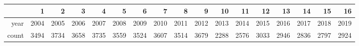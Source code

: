\begin{table}[ht]
\centering
\begin{tabular}{rrrrrrrrrrrrrrrrr}
  \hline
 & 1 & 2 & 3 & 4 & 5 & 6 & 7 & 8 & 9 & 10 & 11 & 12 & 13 & 14 & 15 & 16 \\ 
  \hline
year & 2004 & 2005 & 2006 & 2007 & 2008 & 2009 & 2010 & 2011 & 2012 & 2013 & 2014 & 2015 & 2016 & 2017 & 2018 & 2019 \\ 
  count & 3494 & 3734 & 3658 & 3735 & 3559 & 3524 & 3607 & 3514 & 3679 & 2288 & 2576 & 3033 & 2946 & 2836 & 2797 & 2924 \\ 
   \hline
\end{tabular}
\end{table}
